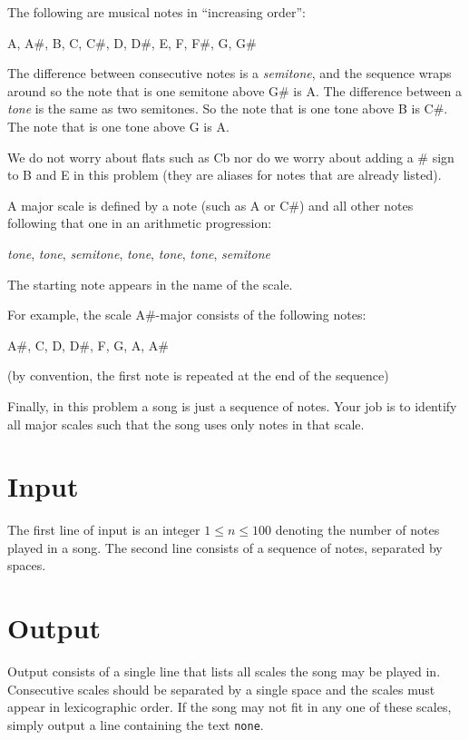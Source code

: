 
The following are musical notes in ``increasing order'':
\begin{center}
    A, A\#, B, C, C\#, D, D\#, E, F, F\#, G, G\#
\end{center}
The difference between consecutive notes is a {\em semitone}, and the sequence
wraps around so the note that is one semitone above G\# is A.
The difference between a {\em tone} is the same as two semitones. So the note that is one tone above B is C\#.
The note that is one tone above G is A.

We do not worry
about flats such as Cb nor do we worry about adding a \# sign to B and E
in this problem (they are aliases for notes that are already listed).

A major scale is defined by a note (such as A or C\#) and all other notes
following that one in an arithmetic progression:
\begin{center}
    {\em tone}, {\em tone}, {\em semitone}, {\em tone}, {\em tone}, {\em tone}, {\em semitone}
\end{center}
The starting note appears in the name of the scale.

For example, the scale A\#-major consists of the following notes:
\begin{center}
    A\#, C, D, D\#, F, G, A, A\#
\end{center}
(by convention, the first note is repeated at the end of the sequence)

Finally, in this problem a song is just a sequence of notes. Your job is to
identify all major scales such that the song uses only notes in that scale.

\section*{Input}

The first line of input is an integer $1\leq n \leq 100$ denoting the number of notes played in a song.
The second line consists of a sequence of notes, separated by spaces.

\section*{Output}

Output consists of a single line that lists all scales the song may be played in.
Consecutive scales should be separated by a single space and the scales must appear
in lexicographic order. If the song may not fit in any one of these scales, simply output
a line containing the text \texttt{none}.
